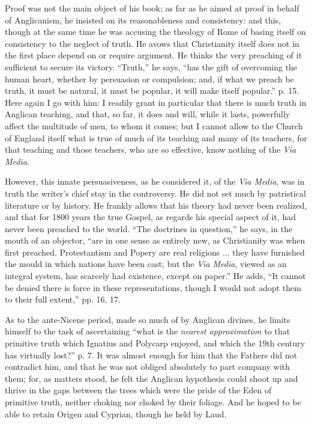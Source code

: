 Proof was not the main object of his book; as far as he aimed at
proof in behalf of Anglicanism, he insisted on its reasonableness and
consistency: and this, though at the same time he was accusing the
theology of Rome of basing itself on consistency to the neglect of
truth. He avows that Christianity itself does not in the first place
depend on or require argument. He thinks the very preaching of it
sufficient to secure its victory. ``Truth,'' he says,
``has the gift of overcoming the human heart, whether by
persuasion or compulsion; and, if what we preach be truth, it must be
natural, it must be popular, it will make itself popular.'' p. 15. Here again I go with him: I readily grant in particular that
there is much truth in Anglican teaching, and that, so far, it does
and will, while it lasts, powerfully affect the multitude of men, to
whom it comes; but I cannot allow to the Church of England itself what
is true of much of its teaching and many of its teachers, for that
teaching and those teachers, who are so effective, know nothing of the
\emph{Via Media}.

However, this innate persuasiveness, as he considered it, of the \emph{Via
Media}, was in truth the writer's chief stay in the controversy. He
did not set much by patristical literature or by history. He frankly
allows that his theory had never been realized, and that for 1800
years the true Gospel, as regards his special aspect of it, had never
been preached to the world. ``The doctrines in question,'' he
says, in the mouth of an objector, ``are in one sense as entirely
new, as Christianity was when first preached. Protestantism and Popery
are real religions ... they have furnished the mould in which nations
have been cast; but the \emph{Via Media}, viewed as an integral
system, has scarcely had existence, except on paper.'' He adds,
``It cannot be denied there is force in these representations,
though I would not adopt them to their full extent,'' pp. 16, 17.

As to the ante-Nicene period, made so much of by Anglican divines, he limits himself to the task of ascertaining ``what is
the \emph{nearest approximation} to that primitive truth which
Ignatius and Polycarp enjoyed, and which the 19th century has
virtually lost?'' p. 7. It was almost enough for him that the
Fathers did not contradict him, and that he was not obliged absolutely
to part company with them; for, as matters stood, he felt the Anglican
hypothesis could shoot up and thrive in the gaps between the trees
which were the pride of the Eden of primitive truth, neither choking
nor choked by their foliage. And he hoped to be able to retain Origen
and Cyprian, though he held by Laud.


